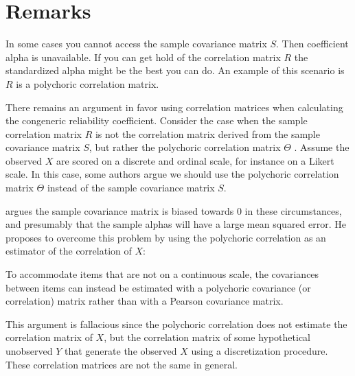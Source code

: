 \documentclass{article}
\theoremstyle{plain}
\theoremstyle{plain}
\theoremstyle{definition}
\theoremstyle{remark}
\theoremstyle{definition}
\theoremstyle{plain}
\theoremstyle{plain}
\theoremstyle{definition}
\DeclareMathOperator{\diag}{diag}
\begin{document}

\section{Remarks}
\label{sec:remarks}
In some cases you cannot access the sample covariance matrix $S$. Then coefficient alpha is unavailable. If you can get hold of the correlation matrix $R$ the standardized alpha might be the best you can do. An example of this scenario is $R$ is a polychoric correlation matrix.

There remains an argument in favor using correlation matrices when calculating the congeneric reliability coefficient. Consider the case when the sample correlation matrix $R$ is not the correlation matrix derived from the sample covariance matrix $S$, but rather the polychoric correlation matrix $\Theta$ \citep{Olsson1979-ti}. Assume the observed $X$ are scored on a discrete and ordinal scale, for instance on a Likert scale. In this case, some authors argue we should use the polychoric correlation matrix $\Theta$ instead of the sample covariance matrix $S$. 

\citet[][p. 415]{McNeish2018-vu} argues the sample covariance matrix is biased towards $0$ in these circumstances, and presumably that the sample alphas will have a large mean squared error. He proposes to overcome this problem by using the polychoric correlation as an estimator of the correlation of $X$:
\begin{displayquote}To accommodate items that are not on a continuous scale, the
covariances between items can instead be estimated with a polychoric covariance (or correlation) matrix rather than with a Pearson covariance matrix.
\end{displayquote}
This argument is fallacious since the polychoric correlation does not estimate the correlation matrix of $X$, but the correlation matrix of some hypothetical unobserved $Y$ that generate the observed $X$ using a discretization procedure. These correlation matrices are not the same in general. 
\end{document}
